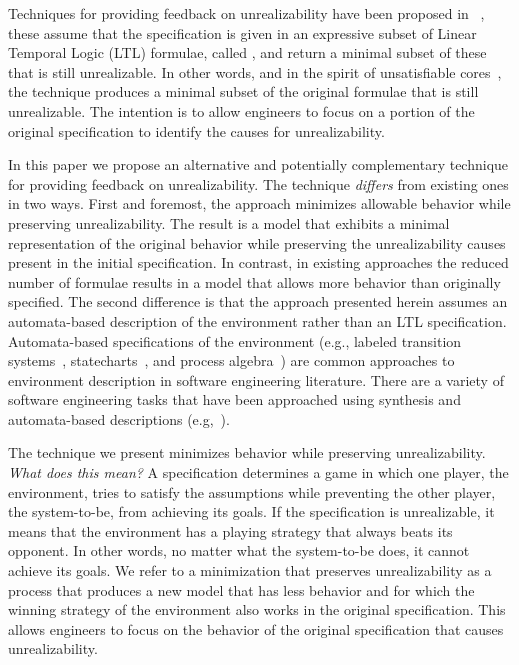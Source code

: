 Techniques for providing feedback on unrealizability have been proposed in ~\cite{DBLP:conf/fmcad/KonighoferHB09, DBLP:journals/scp/Schuppan12,DBLP:conf/fmcad/AlurMT13},
these assume that the specification is given in an expressive subset of Linear Temporal Logic (LTL) formulae, called \gr, and return a minimal subset of these that is still unrealizable. In other words, and in the spirit of unsatisfiable cores~\cite{Torlak:2008}, the technique produces a minimal subset of the original formulae that is still unrealizable. The intention is to allow engineers to focus on a portion of the original specification to identify the causes for unrealizability. 

In this paper we propose an alternative and potentially complementary technique for providing feedback on unrealizability. The technique \textit{differs} from existing ones in two ways. First and foremost, the approach minimizes allowable behavior while preserving unrealizability. The result is a model that exhibits a minimal representation of the original behavior while preserving the unrealizability causes present in the initial specification. In contrast, in existing approaches the reduced number of formulae results in a model that allows more behavior than originally specified. The second difference is that the approach presented herein assumes an automata-based description of the environment rather than an LTL specification. Automata-based specifications of the environment (e.g., labeled transition systems~\cite{Keller:1976}, statecharts~\cite{Harel:1987}, and process algebra~\cite{Milner:1982,Hoare:1983}) are common approaches to environment description in software engineering literature. There are a variety of software engineering tasks that have been approached using synthesis and automata-based descriptions (e.g,~\cite{Letier:2013:RMS,DIppolito:2013,Pistore:2004:PMW}). %

The technique we present minimizes behavior  while preserving unrealizability. \textit{What does this mean?} A specification determines a game in which one player, the environment, tries to satisfy the assumptions while preventing the other player, the system-to-be, from achieving its goals. If the specification is unrealizable, it means that the environment has a playing strategy that always beats its opponent. In other words, no matter what the system-to-be does, it cannot achieve its goals. We refer to a minimization that preserves unrealizability as a process that produces a new model that has less behavior and for which the winning strategy of the environment also works in the original specification. This allows engineers to focus on the behavior of the original specification that causes unrealizability. 

